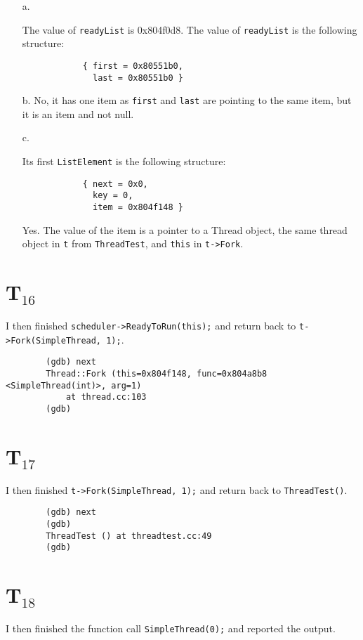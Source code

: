 \documentclass[letterpaper, 10pt]{article}
\begin{document}
	\begin{itemize}
		\item[a.]{The value of {\tt readyList} is 0x804f0d8. The value of {\tt *readyList} is the following structure:
		\begin{verbatim}
			{ first = 0x80551b0,
			  last = 0x80551b0 }
		\end{verbatim}}
		\item[b.]{No, it has one item as {\tt first} and {\tt last} are pointing to the same item, but it is an item and not null.}
		\item[c.]{Its first {\tt ListElement} is the following structure:
		\begin{verbatim}
			{ next = 0x0,
			  key = 0,
			  item = 0x804f148 }
		\end{verbatim}
		Yes. The value of the item is a pointer to a Thread object, the same thread object in {\tt t} from {\tt ThreadTest}, and {\tt this} in {\tt t->Fork}.}
	\end{itemize}

	\section*{T$_{16}$}

	I then finished {\tt scheduler->ReadyToRun(this);} and return back to {\tt t->Fork(SimpleThread, 1);}.

	\begin{verbatim}
		(gdb) next
		Thread::Fork (this=0x804f148, func=0x804a8b8 <SimpleThread(int)>, arg=1)
			at thread.cc:103
		(gdb)
	\end{verbatim}

	\section*{T$_{17}$}

	I then finished {\tt t->Fork(SimpleThread, 1);} and return back to {\tt ThreadTest()}.

	\begin{verbatim}
		(gdb) next
		(gdb)
		ThreadTest () at threadtest.cc:49
		(gdb)
	\end{verbatim}

	\section*{T$_{18}$}

	I then finished the function call {\tt SimpleThread(0);} and reported the output.
\end{document}
